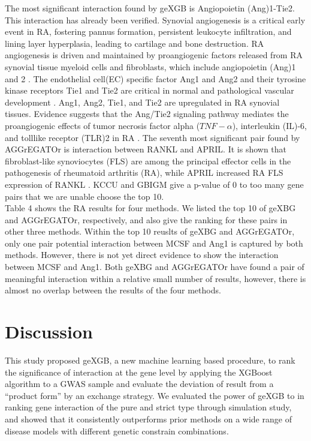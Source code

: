 \documentclass[11pt]{article}
\theoremstyle{plain}
\theoremstyle{definition}
\theoremstyle{remark}
\begin{document}
\noindent The most significant interaction found by geXGB is Angiopoietin (Ang)1-Tie2. This interaction has already been verified. Synovial angiogenesis is a critical early event in RA, fostering pannus formation, persistent leukocyte infiltration, and lining layer hyperplasia, leading to cartilage and bone destruction\cite{14,15}. RA angiogenesis is driven and maintained by proangiogenic factors released from RA synovial tissue myeloid cells and fibroblasts, which include angiopoietin (Ang)1 and 2 \cite{16,17}. The endothelial cell(EC) specific factor Ang1 and Ang2 and their tyrosine kinase receptors Tie1 and Tie2 are critical in normal and pathological vascular development \cite{18}. Ang1, Ang2, Tie1, and Tie2 are upregulated in RA synovial tissues. Evidence suggests that the Ang/Tie2 signaling pathway mediates the proangiogenic effects of tumor necrosis factor alpha ($TNF-\alpha$), interleukin (IL)-6, and tolllike receptor (TLR)2 in RA \cite{17,19}. The seventh most significant pair found by AGGrEGATOr is interaction between RANKL and APRIL. It is shown that fibroblast-like synoviocytes (FLS) are among the principal effector cells in the pathogenesis of rheumatoid arthritis (RA), while APRIL increased RA FLS expression of RANKL \cite{20}. KCCU and GBIGM give a p-value of 0 to too many gene pairs that we are unable choose the top 10. \\

\noindent Table 4 shows the RA results for four methods. We listed the top 10 of geXBG and AGGrEGATOr, respectively, and also give the ranking for these pairs in other three methods. Within the top 10 reuslts of geXBG and AGGrEGATOr, only one pair potential interaction between MCSF and Ang1 is captured by both methods. However, there is not yet direct evidence to show the interaction between MCSF and Ang1. Both geXBG and AGGrEGATOr have found a pair of meaningful interaction within a relative small number of results, however, there is almost no overlap between the results of the four methods.\\


\section{Discussion}


This study proposed geXGB, a new machine learning based procedure, to rank the significance of interaction at the gene level by applying the XGBoost algorithm to a GWAS sample and evaluate the deviation of result from a ``product form'' by an exchange strategy. We evaluated the power of geXGB to in ranking gene interaction of the pure and strict type through simulation study, and showed that it consistently outperforms prior methods on a wide range of disease models with different genetic constrain combinations.\\
\end{document}

